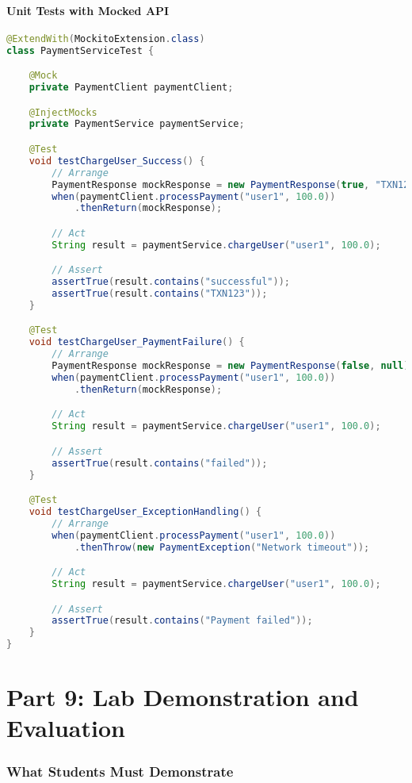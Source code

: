 \documentclass[12pt,a4paper]{article}
\begin{document}
\subsection{Unit Tests with Mocked API}

\begin{lstlisting}[language=java, caption=PaymentServiceTest - Testing with Mock API]
@ExtendWith(MockitoExtension.class)
class PaymentServiceTest {

    @Mock
    private PaymentClient paymentClient;

    @InjectMocks
    private PaymentService paymentService;

    @Test
    void testChargeUser_Success() {
        // Arrange
        PaymentResponse mockResponse = new PaymentResponse(true, "TXN123");
        when(paymentClient.processPayment("user1", 100.0))
            .thenReturn(mockResponse);

        // Act
        String result = paymentService.chargeUser("user1", 100.0);

        // Assert
        assertTrue(result.contains("successful"));
        assertTrue(result.contains("TXN123"));
    }

    @Test
    void testChargeUser_PaymentFailure() {
        // Arrange
        PaymentResponse mockResponse = new PaymentResponse(false, null);
        when(paymentClient.processPayment("user1", 100.0))
            .thenReturn(mockResponse);

        // Act
        String result = paymentService.chargeUser("user1", 100.0);

        // Assert
        assertTrue(result.contains("failed"));
    }

    @Test
    void testChargeUser_ExceptionHandling() {
        // Arrange
        when(paymentClient.processPayment("user1", 100.0))
            .thenThrow(new PaymentException("Network timeout"));

        // Act
        String result = paymentService.chargeUser("user1", 100.0);

        // Assert
        assertTrue(result.contains("Payment failed"));
    }
}
\end{lstlisting}

\newpage

\part{Part 9: Lab Demonstration and Evaluation}

\section{What Students Must Demonstrate}
\end{document}
